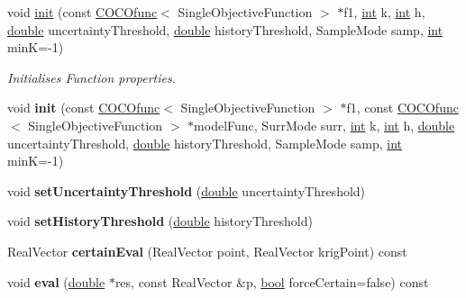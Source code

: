 \begin{DoxyCompactItemize}
\item 
void \hyperlink{classUncertainFunc_a19b36c606e6e0e6bb7fec851ff2a0f8e}{init} (const \hyperlink{classCOCOfunc}{C\+O\+C\+Ofunc}$<$ Single\+Objective\+Function $>$ $\ast$f1, \hyperlink{classint}{int} k, \hyperlink{classint}{int} h, \hyperlink{classdouble}{double} uncertainty\+Threshold, \hyperlink{classdouble}{double} history\+Threshold, Sample\+Mode samp, \hyperlink{classint}{int} minK=-\/1)
\begin{DoxyCompactList}\small\item\em Initialises Function properties. \end{DoxyCompactList}\item 
void {\bfseries init} (const \hyperlink{classCOCOfunc}{C\+O\+C\+Ofunc}$<$ Single\+Objective\+Function $>$ $\ast$f1, const \hyperlink{classCOCOfunc}{C\+O\+C\+Ofunc}$<$ Single\+Objective\+Function $>$ $\ast$model\+Func, Surr\+Mode surr, \hyperlink{classint}{int} k, \hyperlink{classint}{int} h, \hyperlink{classdouble}{double} uncertainty\+Threshold, \hyperlink{classdouble}{double} history\+Threshold, Sample\+Mode samp, \hyperlink{classint}{int} minK=-\/1)\hypertarget{classUncertainFunc_aa9793decff59b54e743c1fb1af58166a}{}\label{classUncertainFunc_aa9793decff59b54e743c1fb1af58166a}

\item 
void {\bfseries set\+Uncertainty\+Threshold} (\hyperlink{classdouble}{double} uncertainty\+Threshold)\hypertarget{classUncertainFunc_ac85e8f24d6a94afc53d90213ca0aec6e}{}\label{classUncertainFunc_ac85e8f24d6a94afc53d90213ca0aec6e}

\item 
void {\bfseries set\+History\+Threshold} (\hyperlink{classdouble}{double} history\+Threshold)\hypertarget{classUncertainFunc_aca5c5df4e4cd7f0a89ea33651091d8c0}{}\label{classUncertainFunc_aca5c5df4e4cd7f0a89ea33651091d8c0}

\item 
Real\+Vector {\bfseries certain\+Eval} (Real\+Vector point, Real\+Vector krig\+Point) const\hypertarget{classUncertainFunc_ac85c9fadbc1b5d5da80ce143eed764af}{}\label{classUncertainFunc_ac85c9fadbc1b5d5da80ce143eed764af}

\item 
void {\bfseries eval} (\hyperlink{classdouble}{double} $\ast$res, const Real\+Vector \&p, \hyperlink{classbool}{bool} force\+Certain=false) const\hypertarget{classUncertainFunc_a15bea4023bd717aa81a986e8d7b144bf}{}\label{classUncertainFunc_a15bea4023bd717aa81a986e8d7b144bf}


\end{DoxyCompactItemize}
